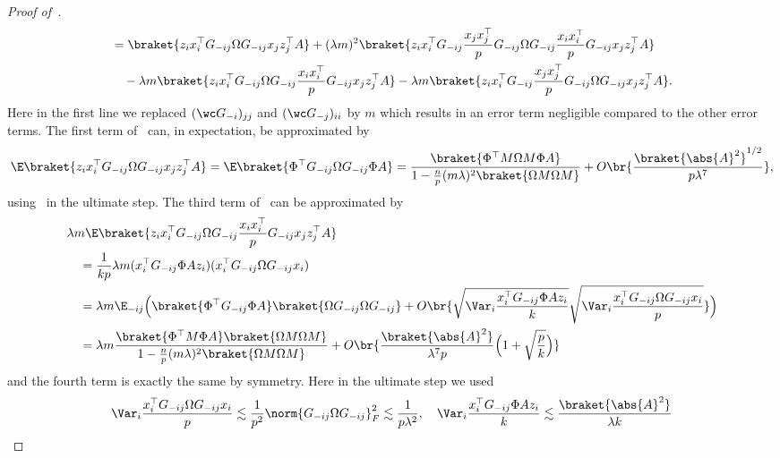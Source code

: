 \begin{proof}[Proof of~]
\begin{equation}
\begin{split}
            & = \braket{z_i x_i^\top G_{-ij} \Omega G_{-ij} x_j z_j^\top A} + (\lambda m)^2 \braket{z_i x_i^\top  G_{-ij}\frac{x_jx_j^\top}{p}G_{-ij} \Omega  G_{-ij}\frac{x_ix_i^\top}{p}G_{-ij} x_j z_j^\top A}\\
            &\quad - \lambda m \braket{z_i x_i^\top G_{-ij}\Omega G_{-ij}\frac{x_ix_i^\top}{p}G_{-ij} x_j z_j^\top A} - \lambda m \braket{z_i x_i^\top G_{-ij}\frac{x_jx_j^\top}{p}G_{-ij} \Omega G_{-ij} x_j z_j^\top A}.
        \end{split}
    \end{equation}
    Here in the first line we replaced $(\wc G_{-i})_{jj}$ and $(\wc G_{-j})_{ii}$ by $m$ which results in an error term negligible compared to the other error terms. The first term of~ can, in expectation, be approximated by
    \begin{equation}
        \E\braket{z_i x_i^\top G_{-ij} \Omega G_{-ij} x_j z_j^\top A} = \E\braket{\Phi^\top G_{-ij} \Omega G_{-ij} \Phi A} = \frac{\braket{\Phi^\top M\Omega M \Phi A}}{1-\frac{n}{p}(m\lambda)^2 \braket{\Omega M \Omega M}} + O\br{\frac{\braket{\abs{A}^2}^{1/2}}{p\lambda^7}},
    \end{equation}
    using~ in the ultimate step. The third term of~ can be approximated by
    \begin{equation}
        \begin{split}
            &\lambda m \E \braket{z_i x_i^\top G_{-ij}\Omega G_{-ij}\frac{x_ix_i^\top}{p}G_{-ij} x_j z_j^\top A}\\
            &\quad= \frac{1}{kp}\lambda m(x_i^\top G_{-ij} \Phi Az_i) (x_i^\top G_{-ij}\Omega G_{-ij} x_i)\\
            &\quad = \lambda m \E_{-ij}\Bigl(\braket{\Phi^\top G_{-ij}\Phi A} \braket{\Omega G_{-ij}\Omega G_{-ij}} + O\br{\sqrt{\Var_i \frac{x_i^\top G_{-ij} \Phi Az_i}{k}}\sqrt{\Var_i \frac{x_i^\top G_{-ij}\Omega G_{-ij} x_i}{p}} }\Bigr) \\
            &\quad= \lambda m \frac{\braket{\Phi^\top M \Phi A} \braket{\Omega M\Omega M}}{1-\frac{n}{p}(m\lambda)^2 \braket{\Omega M \Omega M}} + O\br{\frac{\braket{\abs{A}^2}}{\lambda^{7}p}\Bigl(1+\sqrt{\frac{p}{k}}\Bigr)}
        \end{split}
    \end{equation}
    and the fourth term is exactly the same by symmetry. Here in the ultimate step we used
    \begin{equation}
        \Var_i \frac{x_i^\top G_{-ij}\Omega G_{-ij} x_i}{p} \lesssim \frac{1}{p^2}\norm{G_{-ij}\Omega G_{-ij}}_F^2\lesssim\frac{1}{p\lambda^2}, \quad \Var_i \frac{x_i^\top G_{-ij}\Phi A z_i}{k}\lesssim \frac{\braket{\abs{A}^2}}{\lambda k}

\end{equation}
\end{proof}
